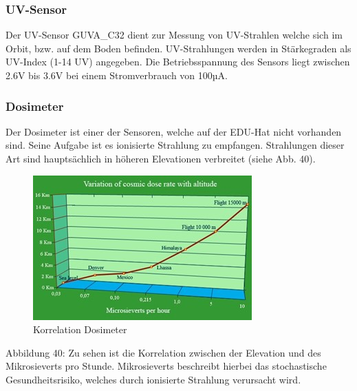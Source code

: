 \subsubsection{UV-Sensor}\label{uvsens}
Der UV-Sensor GUVA\_C32 dient zur Messung von UV-Strahlen welche sich im Orbit, bzw. auf dem Boden befinden. UV-Strahlungen werden in Stärkegraden\autocite{Cosmic} als UV-Index (1-14 UV) angegeben. Die Betriebsspannung des Sensors liegt zwischen 2.6V bis 3.6V bei einem Stromverbrauch von 100µA.  

\subsubsection{Dosimeter}\label{dosimet}
Der Dosimeter ist einer der Sensoren, welche auf der EDU-Hat nicht vorhanden sind. Seine Aufgabe ist es ionisierte Strahlung zu empfangen. Strahlungen dieser Art sind hauptsächlich in höheren Elevationen verbreitet (siehe Abb. 40).\\
\vspace{3mm}
\begin{figure}[H]
    \centering
    \includegraphics[scale=1.2]{image/bilduv.jpg}
    \caption{Korrelation Dosimeter}
    \label{fig:enter-label}
\end{figure}
Abbildung 40: Zu sehen ist die Korrelation zwischen der Elevation und des Mikrosieverts pro Stunde. Mikrosieverts beschreibt hierbei das stochastische Gesundheitsrisiko, welches durch ionisierte Strahlung verursacht wird.


